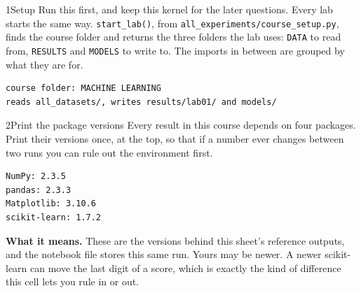 \begin{labquestion}{1}{Setup}
Run this first, and keep this kernel for the later questions. Every lab starts the same way. \texttt{start\_lab()}, from \texttt{all\_experiments/\allowbreak course\_setup.py}, finds the course folder and returns the three folders the lab uses: \texttt{DATA} to read from, \texttt{RESULTS} and \texttt{MODELS} to write to. The imports in between are grouped by what they are for.
\end{labquestion}
\begin{labanswer}

\begin{refoutput}
\begin{lstlisting}[style=utpterminal]
course folder: MACHINE LEARNING
reads all_datasets/, writes results/lab01/ and models/
\end{lstlisting}
\end{refoutput}
\end{labanswer}


\begin{labquestion}{2}{Print the package versions}
Every result in this course depends on four packages. Print their versions once, at the top, so that if a number ever changes between two runs you can rule out the environment first.
\end{labquestion}
\begin{labanswer}

\begin{refoutput}
\begin{lstlisting}[style=utpterminal]
NumPy: 2.3.5
pandas: 2.3.3
Matplotlib: 3.10.6
scikit-learn: 1.7.2
\end{lstlisting}
\end{refoutput}

\textbf{What it means.} These are the versions behind this sheet's reference outputs, and the notebook file stores this same run. Yours may be newer. A newer scikit-learn can move the last digit of a score, which is exactly the kind of difference this cell lets you rule in or out.
\end{labanswer}

